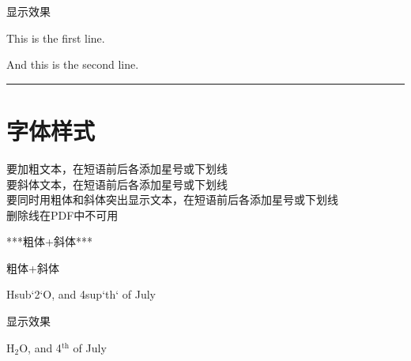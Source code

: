 \documentclass[letterpaper,10pt,english]{sphinxmanual}
\begin{document}
\sphinxAtStartPar
显示效果

\sphinxAtStartPar
This is the first line.

\sphinxAtStartPar
And this is the second line.


\bigskip\hrule\bigskip



\section{字体样式}
\label{\detokenize{other/myst_markdown:id9}}
\sphinxAtStartPar
要加粗文本，在短语前后各添加星号\sphinxcode{\sphinxupquote{*}}或下划线\sphinxcode{\sphinxupquote{\_}}\\
要斜体文本，在短语前后各添加星号\sphinxcode{\sphinxupquote{*}}或下划线\sphinxcode{\sphinxupquote{\_}}\\
要同时用粗体和斜体突出显示文本，在短语前后各添加星号\sphinxcode{\sphinxupquote{*}}或下划线\sphinxcode{\sphinxupquote{\_}}\\
删除线在PDF中不可用

\begin{sphinxVerbatim}[commandchars=\\\{\}]




***粗体+斜体***

\PYGZus{}\PYGZus{}\PYGZus{}粗体+斜体\PYGZus{}\PYGZus{}\PYGZus{}


H\PYGZob{}sub\PYGZcb{}`2`O, and 4\PYGZob{}sup\PYGZcb{}`th` of July
\end{sphinxVerbatim}

\sphinxAtStartPar
显示效果

\sphinxAtStartPar
{}

\sphinxAtStartPar
{}

\sphinxAtStartPar
{}

\sphinxAtStartPar
{}

\sphinxAtStartPar
{}

\sphinxAtStartPar
{}

\sphinxAtStartPar
H$_{\text{2}}$O, and 4$^{\text{th}}$ of July
\end{document}
